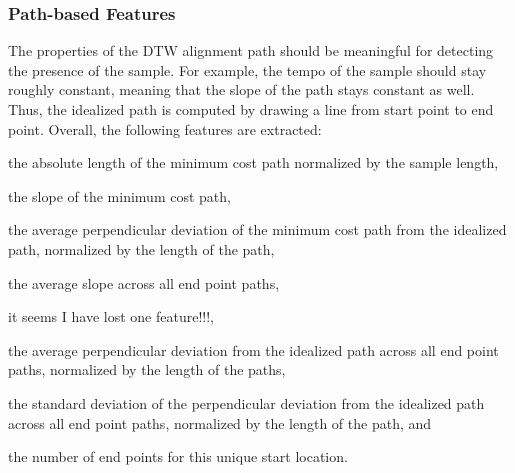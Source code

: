 \documentclass{article}
\begin{document}
\subsubsection{Path-based Features}
The properties of the DTW alignment path should be meaningful for detecting the presence of the sample.  For example, the tempo of the sample should stay roughly constant, meaning that the slope of the path stays constant as well. Thus, the idealized path is computed by drawing a line from start point to end point. 
Overall, the following features are extracted:
\begin{inparaenum}[(i)]
    \item   the absolute length of the minimum cost path normalized by the sample length,
    \item   the slope of the minimum cost path, 
    \item   the average perpendicular deviation of the minimum cost path from the idealized path, normalized by the length of the path,
    \item   the average slope across all end point paths, 
    \item   {\color{red}it seems I have lost one feature!!!},
    \item   the average perpendicular deviation from the idealized path across all end point paths, normalized by the length of the paths,
    \item   the standard deviation of the perpendicular deviation from the idealized path across all end point paths, normalized by the length of the path, and
    \item   the number of end points for this unique start location.
\end{inparaenum}

\end{document}
